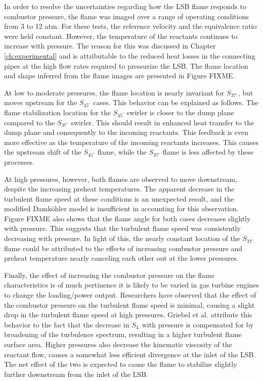In order to resolve the uncertainties regarding how the LSB flame responds to combustor pressure, the flame was imaged over a range of operating conditions from 3 to 12 atm.
For these tests, the reference velocity and the equivalence ratio were held constant.
However, the temperature of the reactants continues to increase with pressure.
The reason for this was discussed in Chapter \ref{ch:experimental} and is attributable to the reduced heat losses in the connecting pipes at the high flow rates required to pressurize the LSB.
The flame location and shape inferred from the flame images are presented in Figure FIXME.

At low to moderate pressures, the flame location is nearly invariant for \(S_{37^\circ}\), but moves upstream for the \(S_{45^\circ}\) cases.
This behavior can be explained as follows.
The flame stabilization location for the \(S_{45^\circ}\) swirler is closer to the dump plane compared to the \(S_{37^\circ}\) swirler.
This should result in enhanced heat transfer to the dump plane and consequently to the incoming reactants.
This feedback is even more effective as the temperature of the incoming reactants increases.
This causes the upstream shift of the \(S_{45^\circ}\) flame, while the \(S_{37^\circ}\) flame is less affected by these processes.

At high pressures, however, both flames are observed to move downstream, despite the increasing preheat temperatures.
The apparent decrease in the turbulent flame speed at these conditions is an unexpected result, and the modified Damk\"ohler model is insufficient in accounting for this observation.
Figure FIXME also shows that the flame angle for both cases decreases slightly with pressure.
This suggests that the turbulent flame speed was consistently decreasing with pressure.
In light of this, the nearly constant location of the \(S_{37^\circ}\) flame could be attributed to the effects of increasing combustor pressure and preheat temperature nearly canceling each other out at the lower pressures.

Finally, the effect of increasing the combustor pressure on the flame characteristics is of much pertinence it is likely to be varied in gas turbine engines to change the loading/power output.
Researchers\cite{1998-kobayashi,2002-kobayashi-b} have observed that the effect of the combustor pressure on the turbulent flame speed is minimal, causing a slight drop in the turbulent flame speed at high pressures.
Griebel et al.\cite{2007-griebel} attribute this behavior to the fact that the decrease in \(S_L\) with pressure is compensated for by broadening of the turbulence spectrum, resulting in a higher turbulent flame surface area.
Higher pressures also decrease the kinematic viscosity of the reactant flow, causes a somewhat less efficient divergence at the inlet of the LSB.
The net effect of the two is expected to cause the flame to stabilize slightly further downstream from the inlet of the LSB.

